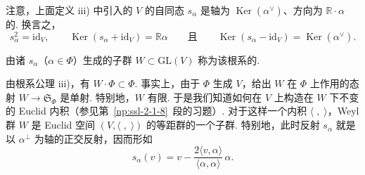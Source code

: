 \begin{numpara}[Weyl 群]\label{np:ssl-3-2-2}
注意，上面定义 iii) 中引入的 $V$ 的自同态 $s_{\alpha}$ 是轴为 $\operatorname{Ker}(\alpha^{\vee})$、方向为 $\mathbb{R}\cdot\alpha$ 的. 换言之，
\[
s_{\alpha}^{2}=\mathrm{id}_{V},\qquad
\operatorname{Ker}(s_{\alpha}+\mathrm{id}_{V})=\mathbb{R}\alpha
\qquad\text{且}\qquad
\operatorname{Ker}(s_{\alpha}-\mathrm{id}_{V})=\operatorname{Ker}(\alpha^{\vee}).
\]
\end{numpara}
\begin{definition*}
由诸 $s_{\alpha}$（$\alpha\in\Phi$）生成的子群 $W\subset\mathrm{GL}(V)$ 称为该根系的.
\end{definition*}
由根系公理 iii)，有 $W\cdot\Phi\subset\Phi$. 事实上，由于 $\Phi$ 生成 $V$，给出 $W$ 在 $\Phi$ 上作用的态射 $W\longrightarrow\mathfrak{S}_{\Phi}$ 是单射. 特别地，$W$ 有限. 于是我们知道如何在 $V$ 上构造在 $W$ 下不变的 Euclid 内积（参见第~\ref{np:ssl-2-1-8}~段的习题）. 对于这样一个内积 $\langle\;,\;\rangle$，Weyl 群 $W$ 是 Euclid 空间 $(V,\langle\;,\;\rangle)$ 的等距群的一个子群. 特别地，此时反射 $s_{\alpha}$ 就是以 $\alpha^{\perp}$ 为轴的正交反射，因而形如
\[s_{\alpha}(v)=v-\frac{2\langle v,\alpha\rangle}{\langle\alpha,\alpha\rangle}\,\alpha.\]
